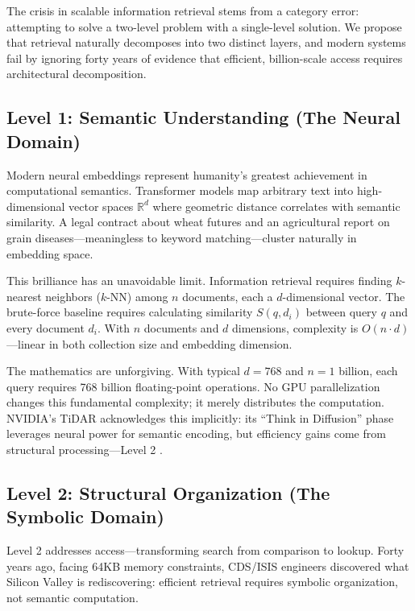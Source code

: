 \documentclass[manuscript,screen,review]{acmart}
\begin{document}
The crisis in scalable information retrieval stems from a category error: attempting to solve a two-level problem with a single-level solution. We propose that retrieval naturally decomposes into two distinct layers, and modern systems fail by ignoring forty years of evidence that efficient, billion-scale access requires architectural decomposition.

\subsection{Level 1: Semantic Understanding (The Neural Domain)}

Modern neural embeddings represent humanity's greatest achievement in computational semantics. Transformer models map arbitrary text into high-dimensional vector spaces $\mathbb{R}^d$ where geometric distance correlates with semantic similarity. A legal contract about wheat futures and an agricultural report on grain diseases---meaningless to keyword matching---cluster naturally in embedding space.

This brilliance has an unavoidable limit. Information retrieval requires finding $k$-nearest neighbors ($k$-NN) among $n$ documents, each a $d$-dimensional vector. The brute-force baseline requires calculating similarity $S(q, d_i)$ between query $q$ and every document $d_i$. With $n$ documents and $d$ dimensions, complexity is $O(n \cdot d)$---linear in both collection size and embedding dimension.

The mathematics are unforgiving. With typical $d = 768$ and $n = 1$ billion, each query requires 768 billion floating-point operations. No GPU parallelization changes this fundamental complexity; it merely distributes the computation. NVIDIA's TiDAR acknowledges this implicitly: its ``Think in Diffusion'' phase leverages neural power for semantic encoding, but efficiency gains come from structural processing---Level 2 \cite{liu2024}.

\subsection{Level 2: Structural Organization (The Symbolic Domain)}

Level 2 addresses access---transforming search from comparison to lookup. Forty years ago, facing 64KB memory constraints, CDS/ISIS engineers discovered what Silicon Valley is rediscovering: efficient retrieval requires symbolic organization, not semantic computation.
\end{document}
